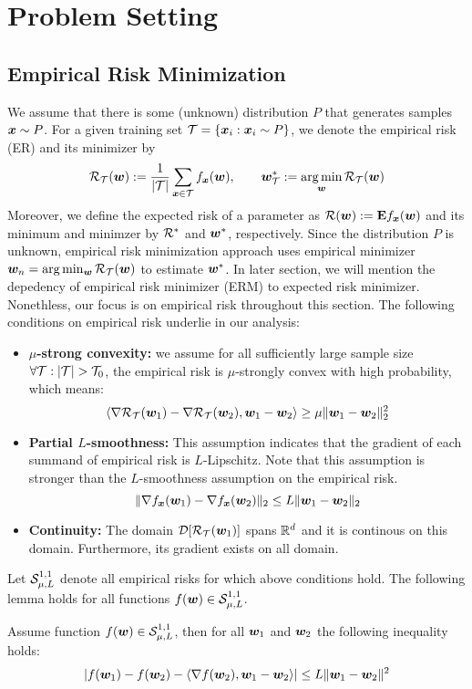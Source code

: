 \section{Problem Setting}
\subsection{Empirical Risk Minimization}
We assume that there is some (unknown) distribution $P$ that generates samples
$\bm{x} \sim P$. For a given training set ${\cal T} = \{\bm{x}_i: \bm{x}_i \sim P \}$, we denote
the empirical risk (ER) and its minimizer by
\begin{align}
{\cal R}_{\cal T}(\bm{w}) := \frac {1}{|{\cal T}|} \sum_{\bm{x} \in {\cal T}} f_{\bm{x}}(\bm{w}),
\qquad \bm{w}^*_{\cal T} := \operatorname*{\arg\min}_{\bm{w}} {\cal R}_{{\cal T}}(\bm{w}) 
\end{align}
Moreover, we define the expected risk of a parameter as ${\cal R}(\bm{w}) := \mathbf{E}
f_{\bm{x}}(\bm{w})$ and its minimum and minimzer by ${\cal R}^*$ and $\bm{w}^*$, respectively.
Since the distribution $P$ is unknown, empirical risk minimization approach
uses empirical minimizer $\bm{w}_n = \arg\min_{\bm{w}} {\cal R}_{{\cal T}}(\bm{w})$ to estimate
$\bm{w}^*$. In later section, we will mention the depedency of empirical risk
minimizer (ERM) to expected risk minimizer. Nonethless, our focus is on
empirical risk throughout this section. The following conditions
on empirical risk underlie in our analysis:
\begin{itemize}
  \item \textbf{$\mu$-strong convexity:} we assume for all sufficiently large
  sample size $\forall \T:|\T|> \T_0$, the empirical risk is $\mu$-strongly
  convex with high probability, which means: 
  \begin{equation*}
  	\langle \nabla {\cal R}_{\cal T}(\bm{w}_1) - \nabla {\cal R}_{\cal T}(\bm{w}_2), \bm{w}_1 - \bm{w}_2 \rangle
  	\geq  \mu \| \bm{w}_1 - \bm{w}_2 \|_2^2
  \end{equation*}
  \item \textbf{Partial $L$-smoothness:} This assumption indicates that the
  gradient of each summand of empirical risk is $L$-Lipschitz. Note that this
  assumption is stronger than the $L$-smoothness assumption on the empirical
  risk.
  \begin{equation*}
  	\| \nabla f_{\bm{x}}(\bm{w}_1) - \nabla f_{\bm{x}}(\bm{w}_2) \|_2
  	\leq  L \| \bm{w}_1 - \bm{w}_2 \|_2
  \end{equation*}
  \item \textbf{Continuity:} The domain $\mathcal{D}[{\cal R}_{\cal T}(\bm{w}_1)]$ spans
  $\mathbb{R}^d$ and it is continous on this domain. Furthermore, its gradient exists on
  all domain. 
\end{itemize}
Let ${\cal S}_{\mu,L}^{1,1}$ denote all empirical risks
 for which above conditions hold. The following lemma holds for
all functions $f(\bm{w}) \in {\cal S}_{\mu,L}^{1,1}$. 
\begin{lemma}
	Assume function $f(\bm{w}) \in {\cal S}_{\mu,L}^{1,1}$, then for all $\bm{w}_1$ and $\bm{w}_2$ the
	following inequality holds: 
    \begin{equation*}
    	| f(\bm{w}_1) - f(\bm{w}_2) - \langle \nabla f(\bm{w}_2), \bm{w}_1 - \bm{w}_2 \rangle | \leq
    	L \| \bm{w}_1 - \bm{w}_2 \| ^2 
    \end{equation*}
\end{lemma}

